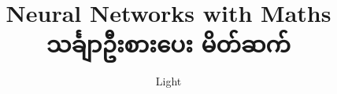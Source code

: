 \title{Neural Networks with Maths\\[0.3em]
       \large သင်္ချာဦးစားပေး မိတ်ဆက်}
\author{Light}
\date{}
\maketitle
